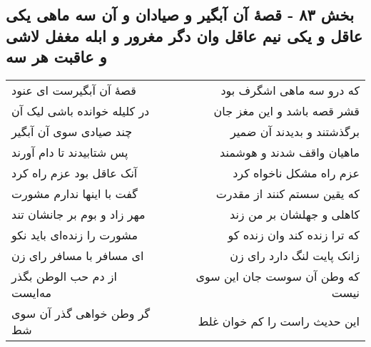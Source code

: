 \begin{center}
\section*{بخش ۸۳ - قصهٔ آن آبگیر و صیادان و آن سه ماهی یکی عاقل و یکی نیم عاقل وان دگر مغرور و ابله مغفل لاشی و عاقبت هر سه}
\label{sec:sh083}
\begin{longtable}{l p{0.5cm} r}
قصهٔ آن آبگیرست ای عنود
&&
که درو سه ماهی اشگرف بود
\\
در کلیله خوانده باشی لیک آن
&&
قشر قصه باشد و این مغز جان
\\
چند صیادی سوی آن آبگیر
&&
برگذشتند و بدیدند آن ضمیر
\\
پس شتابیدند تا دام آورند
&&
ماهیان واقف شدند و هوشمند
\\
آنک عاقل بود عزم راه کرد
&&
عزم راه مشکل ناخواه کرد
\\
گفت با اینها ندارم مشورت
&&
که یقین سستم کنند از مقدرت
\\
مهر زاد و بوم بر جانشان تند
&&
کاهلی و جهلشان بر من زند
\\
مشورت را زنده‌ای باید نکو
&&
که ترا زنده کند وان زنده کو
\\
ای مسافر با مسافر رای زن
&&
زانک پایت لنگ دارد رای زن
\\
از دم حب الوطن بگذر مه‌ایست
&&
که وطن آن سوست جان این سوی نیست
\\
گر وطن خواهی گذر آن سوی شط
&&
این حدیث راست را کم خوان غلط
\\
\end{longtable}
\end{center}

